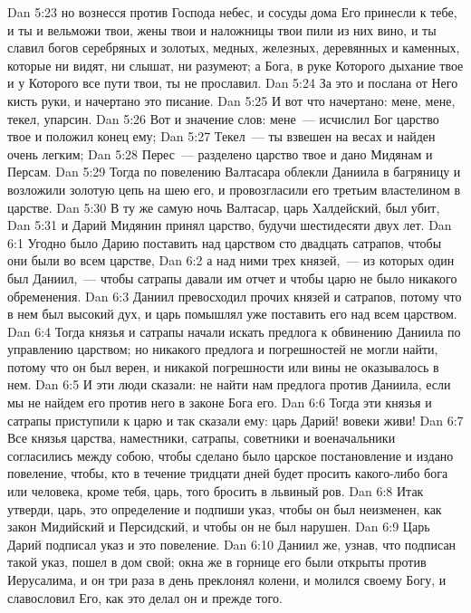 \vs Dan 5:23 но вознесся против Господа небес, и сосуды дома Его принесли к тебе, и ты и вельможи твои, жены твои и наложницы твои пили из них вино, и ты славил богов серебряных и золотых, медных, железных, деревянных и каменных, которые ни видят, ни слышат, ни разумеют; а Бога, в руке Которого дыхание твое и у Которого все пути твои, ты не прославил.
\vs Dan 5:24 За это и послана от Него кисть руки, и начертано это писание.
\vs Dan 5:25 И вот что начертано: мене, мене, текел, упарсин.
\vs Dan 5:26 Вот и значение слов: мене~--- исчислил Бог царство твое и положил конец ему;
\vs Dan 5:27 Текел~--- ты взвешен на весах и найден очень легким;
\vs Dan 5:28 Перес~--- разделено царство твое и дано Мидянам и Персам.
\rsbpar\vs Dan 5:29 Тогда по повелению Валтасара облекли Даниила в багряницу и возложили золотую цепь на шею его, и провозгласили его третьим властелином в царстве.
\vs Dan 5:30 В ту же самую ночь Валтасар, царь Халдейский, был убит,
\vs Dan 5:31 и Дарий Мидянин принял царство, будучи шестидесяти двух лет.
\vs Dan 6:1 Угодно было Дарию поставить над царством сто двадцать сатрапов, чтобы они были во всем царстве,
\vs Dan 6:2 а над ними трех князей,~--- из которых один был Даниил,~--- чтобы сатрапы давали им отчет и чтобы царю не было никакого обременения.
\vs Dan 6:3 Даниил превосходил прочих князей и сатрапов, потому что в нем был высокий дух, и царь помышлял уже поставить его над всем царством.
\vs Dan 6:4 Тогда князья и сатрапы начали искать предлога к обвинению Даниила по управлению царством; но никакого предлога и погрешностей не могли найти, потому что он был верен, и никакой погрешности или вины не оказывалось в нем.
\vs Dan 6:5 И эти люди сказали: не найти нам предлога против Даниила, если мы не найдем его против него в законе Бога его.
\vs Dan 6:6 Тогда эти князья и сатрапы приступили к царю и так сказали ему: царь Дарий! вовеки живи!
\vs Dan 6:7 Все князья царства, наместники, сатрапы, советники и военачальники согласились между собою, чтобы сделано было царское постановление и издано повеление, чтобы, кто в течение тридцати дней будет просить какого-либо бога или человека, кроме тебя, царь, того бросить в львиный ров.
\vs Dan 6:8 Итак утверди, царь, это определение и подпиши указ, чтобы он был неизменен, как закон Мидийский и Персидский, и чтобы он не был нарушен.
\vs Dan 6:9 Царь Дарий подписал указ и это повеление.
\vs Dan 6:10 Даниил же, узнав, что подписан такой указ, пошел в дом свой; окна же в горнице его были открыты против Иерусалима, и он три раза в день преклонял колени, и молился своему Богу, и славословил Его, как это делал он и прежде того.
